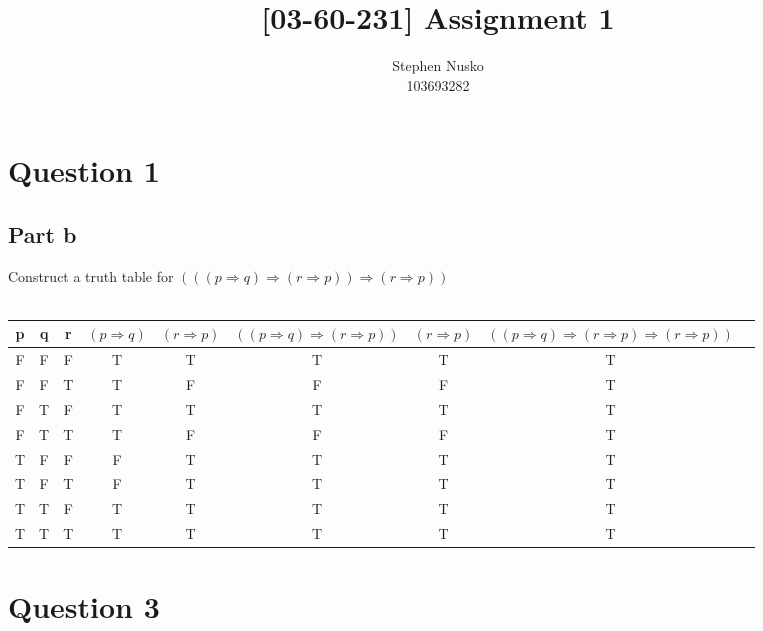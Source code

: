 \documentclass{article}
\title{[03-60-231] Assignment 1}
\author{Stephen Nusko \\ 103693282}
\begin{document}
	\thispagestyle{empty}
	\maketitle	
	\section{Question 1}
		\subsection{Part b}
			Construct a truth table for $(((p \Rightarrow q) \Rightarrow (r \Rightarrow p)) \Rightarrow (r \Rightarrow p))$ \\ \\
			\begin{tabular}{| c * {8}{|c}}
			   \hline
			   p & q & r & $(p \Rightarrow q)$ & $(r \Rightarrow p)$ & $((p \Rightarrow q) \Rightarrow (r \Rightarrow p))$ & $(r \Rightarrow p)$ & $((p \Rightarrow q) \Rightarrow (r \Rightarrow p) \Rightarrow (r \Rightarrow p))$ \\ \hline
			   F & F & F & T & T & T & T & T \\ \hline
			   F & F & T & T & F & F & F & T \\ \hline
			   F & T & F & T & T & T & T & T \\ \hline
			   F & T & T & T & F & F & F & T \\ \hline
			   T & F & F & F & T & T & T & T \\ \hline
			   T & F & T & F & T & T & T & T \\ \hline
			   T & T & F & T & T & T & T & T \\ \hline
			   T & T & T & T & T & T & T & T \\ \hline 
			\end{tabular}
	\section{Question 3}
\end{document}

